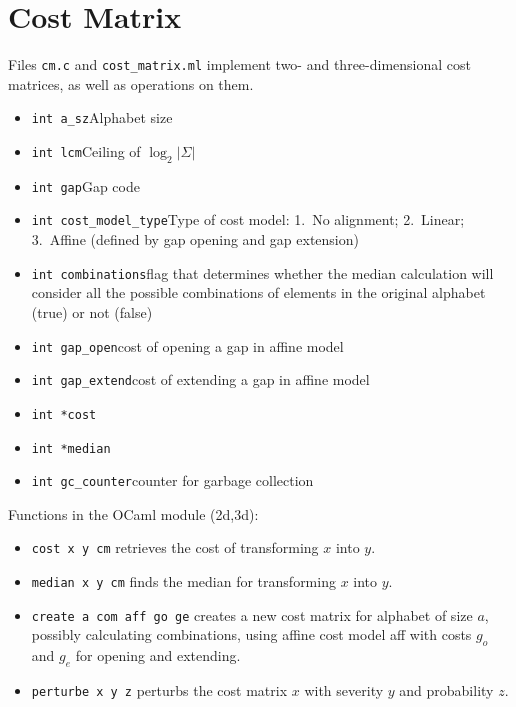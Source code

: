 \documentclass{article}
\begin{document}
\section{Cost Matrix}
\label{sec:costmatrix}

Files \texttt{cm.c} and \texttt{cost\_matrix.ml} implement two- and
three-dimensional cost matrices, as well as operations on them.

\begin{itemize}
\item \texttt{int a\_sz}\textemdash Alphabet size
\item \texttt{int lcm}\textemdash Ceiling of $\log_2 |\Sigma|$
\item \texttt{int gap}\textemdash Gap code
\item \texttt{int cost\_model\_type}\textemdash Type of cost model:  1.~No alignment;
  2.~Linear; 3.~Affine (defined  by gap opening and gap extension)
\item \texttt{int combinations}\textemdash flag that determines whether the median
  calculation will consider all the possible combinations of elements in the
  original alphabet (true) or not (false)
\item \texttt{int gap\_open}\textemdash cost of opening a gap in affine model
\item \texttt{int gap\_extend}\textemdash cost of extending a gap in affine model
\item \texttt{int *cost}
\item \texttt{int *median}
\item \texttt{int gc\_counter}\textemdash counter for garbage collection
\end{itemize}

Functions in the OCaml module (2d,3d):
\begin{itemize}
\item \texttt{cost x y cm} retrieves the cost of transforming $x$ into $y$.
\item \texttt{median x y cm} finds the median for transforming $x$ into $y$.
\item \texttt{create a com aff go ge} creates a new cost matrix for alphabet of
  size $a$, possibly calculating combinations, using affine cost model aff with
  costs $g_o$ and $g_e$ for opening and extending.
\item \texttt{perturbe x y z} perturbs the cost matrix $x$ with severity $y$
  and probability $z$.
\end{itemize}
\end{document}
